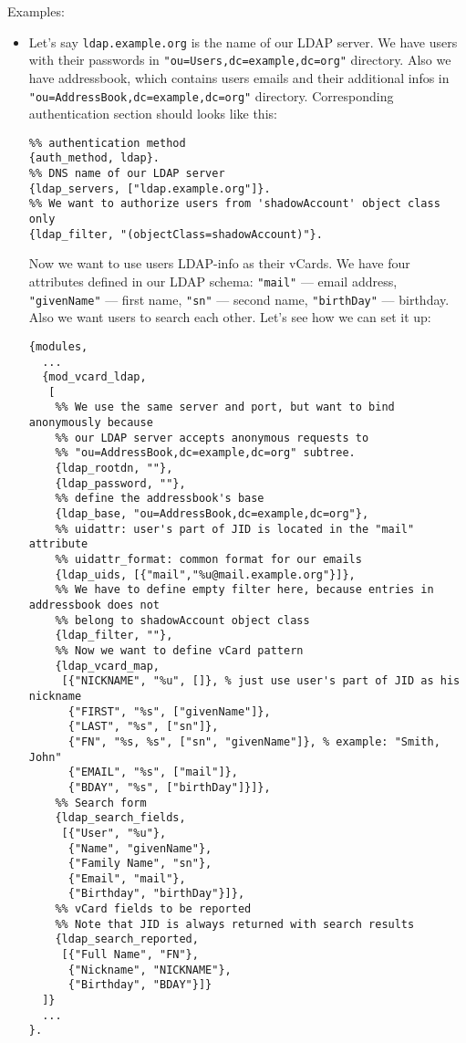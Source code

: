\documentclass[a4paper,10pt]{book}
\newcommand{\term}[1]{\texttt{#1}}
\begin{document}
Examples:
\begin{itemize}
\item

Let's say \term{ldap.example.org} is the name of our LDAP server. We have
users with their passwords in \term{"ou=Users,dc=example,dc=org"} directory.
Also we have addressbook, which contains users emails and their additional
infos in \term{"ou=AddressBook,dc=example,dc=org"} directory.  Corresponding
authentication section should looks like this:

\begin{verbatim}
%% authentication method
{auth_method, ldap}.
%% DNS name of our LDAP server
{ldap_servers, ["ldap.example.org"]}.
%% We want to authorize users from 'shadowAccount' object class only
{ldap_filter, "(objectClass=shadowAccount)"}.
\end{verbatim}

Now we want to use users LDAP-info as their vCards. We have four attributes
defined in our LDAP schema: \term{"mail"} --- email address, \term{"givenName"}
--- first name, \term{"sn"} --- second name, \term{"birthDay"} --- birthday.
Also we want users to search each other. Let's see how we can set it up:

\begin{verbatim}
{modules,
  ...
  {mod_vcard_ldap,
   [
    %% We use the same server and port, but want to bind anonymously because
    %% our LDAP server accepts anonymous requests to
    %% "ou=AddressBook,dc=example,dc=org" subtree.
    {ldap_rootdn, ""},
    {ldap_password, ""},
    %% define the addressbook's base
    {ldap_base, "ou=AddressBook,dc=example,dc=org"},
    %% uidattr: user's part of JID is located in the "mail" attribute
    %% uidattr_format: common format for our emails
    {ldap_uids, [{"mail","%u@mail.example.org"}]},
    %% We have to define empty filter here, because entries in addressbook does not
    %% belong to shadowAccount object class
    {ldap_filter, ""},
    %% Now we want to define vCard pattern
    {ldap_vcard_map,
     [{"NICKNAME", "%u", []}, % just use user's part of JID as his nickname
      {"FIRST", "%s", ["givenName"]},
      {"LAST", "%s", ["sn"]},
      {"FN", "%s, %s", ["sn", "givenName"]}, % example: "Smith, John"
      {"EMAIL", "%s", ["mail"]},
      {"BDAY", "%s", ["birthDay"]}]},
    %% Search form
    {ldap_search_fields,
     [{"User", "%u"},
      {"Name", "givenName"},
      {"Family Name", "sn"},
      {"Email", "mail"},
      {"Birthday", "birthDay"}]},
    %% vCard fields to be reported
    %% Note that JID is always returned with search results
    {ldap_search_reported,
     [{"Full Name", "FN"},
      {"Nickname", "NICKNAME"},
      {"Birthday", "BDAY"}]}
  ]}
  ...
}.
\end{verbatim}


\end{itemize}
\end{document}
